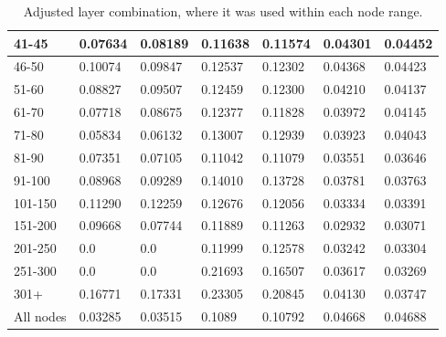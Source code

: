 \begin{table*}[h!]
\begin{tabular}{|l|l|l||l|l||l|l|}
        41-45     & 0.07634                                 & 0.08189                        & 0.11638                          & 0.11574          & 0.04301       & 0.04452          \\ \hline
        46-50     & 0.10074                                 & 0.09847                        & 0.12537                          & 0.12302          & 0.04368       & 0.04423          \\ \hline
        51-60     & 0.08827                                 & 0.09507                        & 0.12459                          & 0.12300          & 0.04210       & 0.04137          \\ \hline
        61-70     & 0.07718                                 & 0.08675                        & 0.12377                          & 0.11828          & 0.03972       & 0.04145          \\ \hline
        71-80     & 0.05834                                 & 0.06132                        & 0.13007                          & 0.12939          & 0.03923       & 0.04043          \\ \hline
        81-90     & 0.07351                                 & 0.07105                        & 0.11042                          & 0.11079          & 0.03551       & 0.03646          \\ \hline
        91-100    & 0.08968                                 & 0.09289                        & 0.14010                          & 0.13728          & 0.03781       & 0.03763          \\ \hline
        101-150   & 0.11290                                 & 0.12259                        & 0.12676                          & 0.12056          & 0.03334       & 0.03391          \\ \hline
        151-200   & 0.09668                                 & 0.07744                        & 0.11889                          & 0.11263          & 0.02932       & 0.03071          \\ \hline
        201-250   & 0.0                                     & 0.0                            & 0.11999                          & 0.12578          & 0.03242       & 0.03304          \\ \hline
        251-300   & 0.0                                     & 0.0                            & 0.21693                          & 0.16507          & 0.03617       & 0.03269          \\ \hline
        301+      & 0.16771                                 & 0.17331                        & 0.23305                          & 0.20845          & 0.04130       & 0.03747          \\ \hline
        All nodes & 0.03285                                 & 0.03515                        & 0.1089                           & 0.10792          & 0.04668       & 0.04688          \\ \hline
    \end{tabular}
    \caption{Adjusted layer combination, where it was used within each node range.}
    \label{tab:ALC-degree-based-ndcg}
\end{table*}

